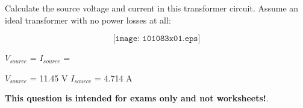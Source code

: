 

Calculate the source voltage and current in this transformer circuit.  Assume an ideal transformer with no power losses at all:

$$\texttt{[image: i01083x01.eps]}$$

$V_{source}$ = \hskip 80pt $I_{source}$ =

\vskip 10pt







$V_{source}$ = 11.45 V \hskip 80pt $I_{source}$ = 4.714 A







{\bf This question is intended for exams only and not worksheets!}.



